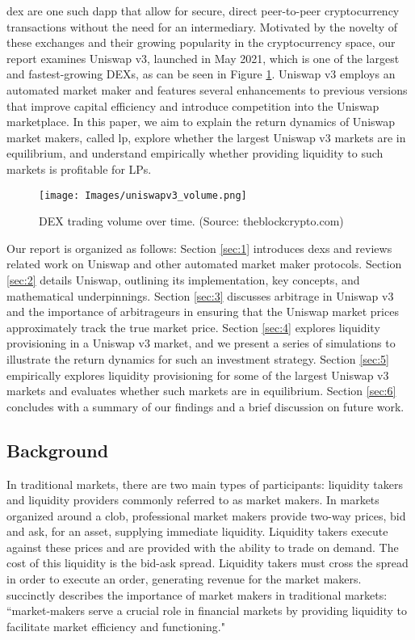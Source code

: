 \documentclass[11pt]{article}
\begin{document}
\gls{dex} are one such \gls{dapp} that allow for secure, direct peer-to-peer cryptocurrency transactions without the need for an intermediary. Motivated by the novelty of these exchanges and their growing popularity in the cryptocurrency space, our report examines Uniswap v3, launched in May 2021, which is one of the largest and fastest-growing DEXs, as can be seen in Figure \ref{fig:dex_trading_vol}. Uniswap v3 employs an automated market maker and features several enhancements to previous versions that improve capital efficiency and introduce competition into the Uniswap marketplace. In this paper, we aim to explain the return dynamics of Uniswap market makers, called \gls{lp}, explore whether the largest Uniswap v3 markets are in equilibrium, and understand empirically whether providing liquidity to such markets is profitable for LPs.

\begin{figure}[H]
    \centering
    \texttt{[image: Images/uniswapv3\_volume.png]}
    \caption{DEX trading volume over time. (Source: theblockcrypto.com)}
    \label{fig:dex_trading_vol}
\end{figure}

Our report is organized as follows: Section \ref{sec:1} introduces \glspl{dex} and reviews related work on Uniswap and other automated market maker protocols. Section \ref{sec:2} details Uniswap, outlining its implementation, key concepts, and mathematical underpinnings. Section \ref{sec:3} discusses arbitrage in Uniswap v3 and the importance of arbitrageurs in ensuring that the Uniswap market prices approximately track the true market price. Section  \ref{sec:4} explores liquidity provisioning in a Uniswap v3 market, and we present a series of simulations to illustrate the return dynamics for such an investment strategy. Section \ref{sec:5} empirically explores liquidity provisioning for some of the largest Uniswap v3 markets and evaluates whether such markets are in equilibrium. Section  \ref{sec:6} concludes with a summary of our findings and a brief discussion on future work. %

\subsection{Background}

In traditional markets, there are two main types of participants: liquidity takers and liquidity providers commonly referred to as market makers. In markets organized around a \gls{clob}, professional market makers provide two-way prices, bid and ask, for an asset, supplying immediate liquidity. Liquidity takers execute against these prices and are provided with the ability to trade on demand. The cost of this liquidity is the bid-ask spread. Liquidity takers must cross the spread in order to execute an order, generating revenue for the market makers. \citet{BankInternationalSettlements} succinctly describes the importance of market makers in traditional markets: ``market-makers serve a crucial role in financial markets by providing liquidity to facilitate market efficiency and functioning."
\end{document}
